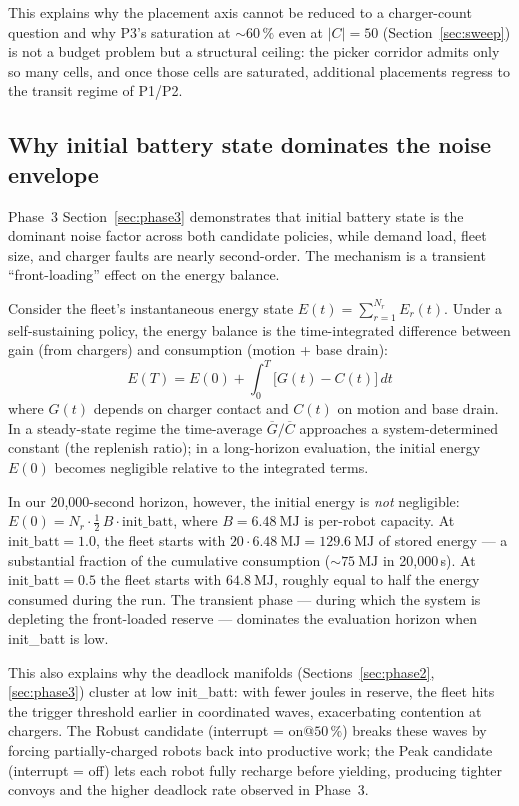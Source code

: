\documentclass[conference]{IEEEtran}
\begin{document}
This explains why the placement axis cannot be reduced to a charger-count question and why P3's saturation at $\sim 60\,\%$ even at $|C|=50$ (Section~\ref{sec:sweep}) is not a budget problem but a structural ceiling: the picker corridor admits only so many cells, and once those cells are saturated, additional placements regress to the transit regime of P1/P2.

\subsection{Why initial battery state dominates the noise envelope}
\label{sec:mech_init_batt}

Phase~3 Section~\ref{sec:phase3} demonstrates that initial battery state is the dominant noise factor across both candidate policies, while demand load, fleet size, and charger faults are nearly second-order. The mechanism is a transient ``front-loading'' effect on the energy balance.

Consider the fleet's instantaneous energy state $E(t) = \sum_{r=1}^{N_r} E_r(t)$. Under a self-sustaining policy, the energy balance is the time-integrated difference between gain (from chargers) and consumption (motion + base drain):
\begin{equation}
  E(T) = E(0) + \int_0^T \big[ G(t) - C(t) \big]\,dt
\end{equation}
where $G(t)$ depends on charger contact and $C(t)$ on motion and base drain. In a steady-state regime the time-average $\overline{G}/\overline{C}$ approaches a system-determined constant (the replenish ratio); in a long-horizon evaluation, the initial energy $E(0)$ becomes negligible relative to the integrated terms.

In our 20{,}000-second horizon, however, the initial energy is \emph{not} negligible: $E(0) = N_r \cdot \frac{1}{2}\, B \cdot \text{init\_batt}$, where $B = \SI{6.48}{\mega\joule}$ is per-robot capacity. At $\text{init\_batt} = 1.0$, the fleet starts with $20 \cdot \SI{6.48}{\mega\joule} = \SI{129.6}{\mega\joule}$ of stored energy --- a substantial fraction of the cumulative consumption ($\sim\SI{75}{\mega\joule}$ in 20{,}000\,s). At $\text{init\_batt} = 0.5$ the fleet starts with $\SI{64.8}{\mega\joule}$, roughly equal to half the energy consumed during the run. The transient phase --- during which the system is depleting the front-loaded reserve --- dominates the evaluation horizon when init\_batt is low.

This also explains why the deadlock manifolds (Sections~\ref{sec:phase2}, \ref{sec:phase3}) cluster at low init\_batt: with fewer joules in reserve, the fleet hits the trigger threshold earlier in coordinated waves, exacerbating contention at chargers. The Robust candidate (interrupt = on@$50\,\%$) breaks these waves by forcing partially-charged robots back into productive work; the Peak candidate (interrupt = off) lets each robot fully recharge before yielding, producing tighter convoys and the higher deadlock rate observed in Phase~3.
\end{document}
